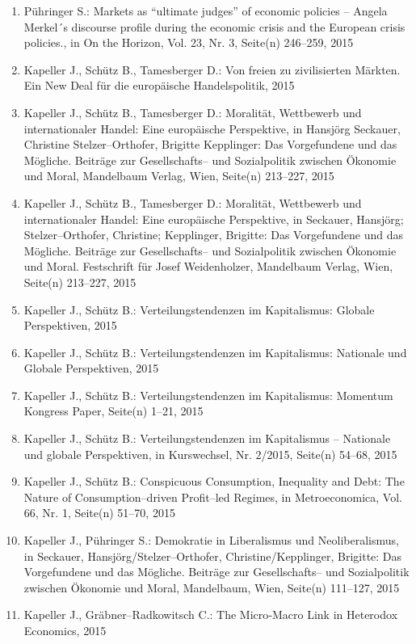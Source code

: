 \begin{enumerate}
	 \item Pühringer S.: Markets as “ultimate judges” of economic policies -- Angela Merkel´s discourse profile during the economic crisis and the European crisis policies., in On the Horizon, Vol. 23, Nr. 3, Seite(n) 246--259, 2015
	 \item Kapeller J., Schütz B., Tamesberger D.: Von freien zu zivilisierten Märkten. Ein New Deal für die europäische Handelspolitik, 2015
	 \item Kapeller J., Schütz B., Tamesberger D.: Moralität, Wettbewerb und internationaler Handel: Eine europäische Perspektive, in Hansjörg Seckauer, Christine Stelzer--Orthofer, Brigitte Kepplinger: Das Vorgefundene und das Mögliche. Beiträge zur Gesellschafts-- und Sozialpolitik zwischen Ökonomie und Moral, Mandelbaum Verlag, Wien, Seite(n) 213--227, 2015
	 \item Kapeller J., Schütz B., Tamesberger D.: Moralität, Wettbewerb und internationaler Handel: Eine europäische Perspektive, in Seckauer, Hansjörg; Stelzer--Orthofer, Christine; Kepplinger, Brigitte: Das Vorgefundene und das Mögliche. Beiträge zur Gesellschafts-- und Sozialpolitik zwischen Ökonomie und Moral. Festschrift für Josef Weidenholzer, Mandelbaum Verlag, Wien, Seite(n) 213--227, 2015
	 \item Kapeller J., Schütz B.: Verteilungstendenzen im Kapitalismus: Globale Perspektiven, 2015
	 \item Kapeller J., Schütz B.: Verteilungstendenzen im Kapitalismus: Nationale und Globale Perspektiven, 2015
	 \item Kapeller J., Schütz B.: Verteilungstendenzen im Kapitalismus: Momentum Kongress Paper, Seite(n) 1--21, 2015
	 \item Kapeller J., Schütz B.: Verteilungstendenzen im Kapitalismus -- Nationale und globale Perspektiven, in Kurswechsel, Nr. 2/2015, Seite(n) 54--68, 2015
	 \item Kapeller J., Schütz B.: Conspicuous Consumption, Inequality and Debt: The Nature of Consumption--driven Profit--led Regimes, in Metroeconomica, Vol. 66, Nr. 1, Seite(n) 51--70, 2015
	 \item Kapeller J., Pühringer S.: Demokratie in Liberalismus und Neoliberalismus, in Seckauer, Hansjörg/Stelzer--Orthofer, Christine/Kepplinger, Brigitte: Das Vorgefundene und das Mögliche. Beiträge zur Gesellschafts-- und Sozialpolitik zwischen Ökonomie und Moral, Mandelbaum, Wien, Seite(n) 111--127, 2015
	 \item Kapeller J., Gräbner--Radkowitsch C.: The Micro‐Macro Link in Heterodox Economics, 2015

\end{enumerate}
